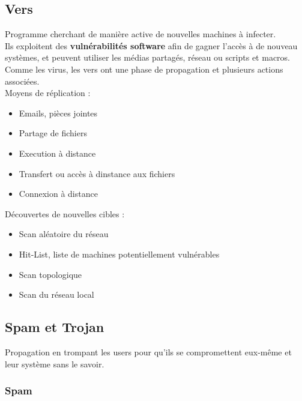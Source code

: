 \documentclass{report}
\begin{document}
		\subsection{Vers}

			Programme cherchant de manière active de nouvelles machines à infecter.\\
			Ils exploitent des \textbf{vulnérabilités software} afin de gagner l'accès à de nouveau systèmes, et peuvent utiliser les médias partagés, réseau ou scripts et macros.\\

			Comme les virus, les vers ont une phase de propagation et plusieurs actions associées.\\

			Moyens de réplication : \\

			\begin{itemize}
				\item Emails, pièces jointes
				\item Partage de fichiers
				\item Execution à distance
				\item Transfert ou accès à dinstance aux fichiers
				\item Connexion à distance\\
			\end{itemize}

			Découvertes de nouvelles cibles : \\

			\begin{itemize}
				\item Scan aléatoire du réseau
				\item Hit-List, liste de machines potentiellement vulnérables
				\item Scan topologique
				\item Scan du réseau local\\
			\end{itemize}

		\subsection{Spam et Trojan}

			Propagation en trompant les users pour qu'ils se compromettent eux-même et leur système sans le savoir.\\

			\subsubsection{Spam}
\end{document}
